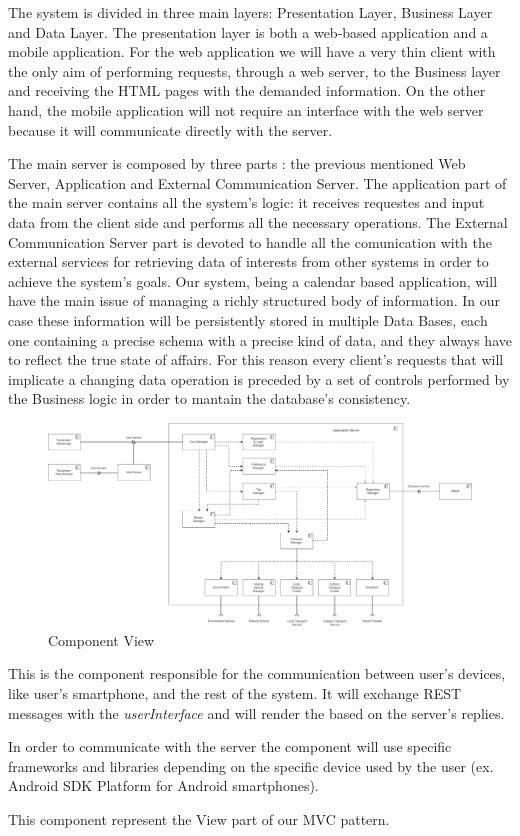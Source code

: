 The system is divided in three main layers: Presentation Layer, Business Layer and Data Layer.
The presentation layer is both a web-based application and a mobile application. For the web application we will have a very thin client with the only aim of performing requests, through a web server, to the Business layer and receiving the HTML pages with the demanded information.
On the other hand, the mobile application will not require an interface with the web server because it will communicate directly with the server.

The main server is composed by three parts : the previous mentioned Web Server, Application and External Communication Server. The application part of the main server contains all the system's logic: it receives requestes and input data from the client side and performs all the necessary operations.
The External Communication Server part is devoted to handle all the comunication with the external services for retrieving data of interests from other systems in order to achieve the system's goals.
Our system, being a calendar based application, will have the main issue of managing a richly structured body of information. In our case these information will be persistently stored in multiple Data Bases, each one containing a precise schema with a precise kind of data, and they always have to reflect the true state of affairs. For this reason every client's requests that will implicate a changing data operation is preceded by a set of controls performed by the Business logic in order to mantain the database’s consistency.

\begin{figure}[H]
	\centering
	\includegraphics[scale=0.17]{Images/Architecture/Components_View}
	\caption{Component View}
\end{figure}
This is the component responsible for the communication between user’s devices, like user’s smartphone, and the rest of the system. It will exchange REST messages with the \emph{userInterface} and will render the  based on the server’s replies.\par
In order to communicate with the server the component will use specific frameworks and libraries depending on the specific device used by the user (ex. Android SDK Platform for Android smartphones).\par
This component represent the View part of our MVC pattern.

